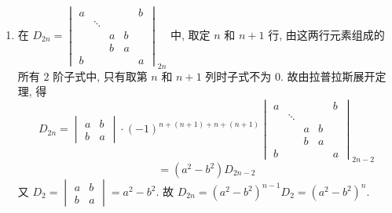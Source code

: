 	\paragraph{} %
		\begin{enumerate}
			\item %
			      在 $D_{2n} = \begin{vmatrix}
					      a &        &   &   & b \\
					        & \ddots &   &   &   \\
					        &        & a & b &   \\
					        &        & b & a &   \\
					      b &        &   &   & a
				      \end{vmatrix}_{2n}$ 中, 取定 $n$ 和 $n+1$ 行,
			      由这两行元素组成的所有 $2$ 阶子式中, 只有取第 $n$ 和 $n+1$ 列时子式不为 $0$.
			      故由拉普拉斯展开定理, 得
			      \[D_{2n} = \begin{vmatrix}
					      a & b \\
					      b & a
				      \end{vmatrix} \cdot (-1)^{n+(n+1)+n+(n+1)} \begin{vmatrix}
					      a &        &   &   & b \\
					        & \ddots &   &   &   \\
					        &        & a & b &   \\
					        &        & b & a &   \\
					      b &        &   &   & a
				      \end{vmatrix}_{2n-2}\]
			      \[= (a^2-b^2)D_{2n-2}\]
			      又 $D_2 = \begin{vmatrix}
					      a & b \\
					      b & a
				      \end{vmatrix} = a^2-b^2$.
			      故 $D_{2n} = (a^2-b^2)^{n-1}D_2 = (a^2-b^2)^n$.


\end{enumerate}
